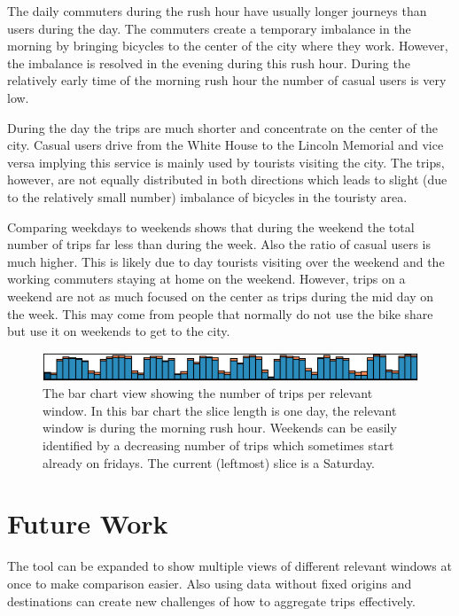 The daily commuters during the rush hour have usually longer
journeys than users during the day. The commuters create
a temporary imbalance in the morning by bringing bicycles
to the center of the city where they work. However, the imbalance is
resolved in the evening during this rush hour. During the relatively
early time of the morning rush hour the number of casual users
is very low.

During the day the trips are much shorter and concentrate on the
center of the city. Casual users drive from the White House to
the Lincoln Memorial and vice versa implying this service is mainly
used by tourists visiting the city. The trips, however, are not
equally distributed in both directions which leads to slight (due to
the relatively small number) imbalance of bicycles in the touristy
area.

Comparing weekdays to weekends shows that during the weekend
the total number of trips far less than during the week.
Also the ratio of casual users is much higher.
This is likely due to day tourists visiting over the weekend
and the working commuters staying at home on the weekend.
However, trips on a weekend are not as much focused on the center
as trips during the mid day on the week.
This may come from
people that normally do not use the bike share but use it on
weekends to get to the city.

\begin{figure}[h]
\centering
\includegraphics[width=\linewidth]{images/barchart.png}
\caption{The bar chart view showing the number of trips per relevant
window.
In this bar chart the slice length is one day, the relevant window is
during the morning rush hour.
Weekends can be easily identified by a decreasing number of trips
which sometimes start already on fridays.
The current (leftmost) slice is a Saturday.}
\label{fig:bar}
\end{figure}

\section{Future Work}
The tool can be expanded to show multiple views of different
relevant windows at once to make comparison easier.
Also using data without fixed origins and destinations
can create new challenges of how to aggregate trips
effectively.
